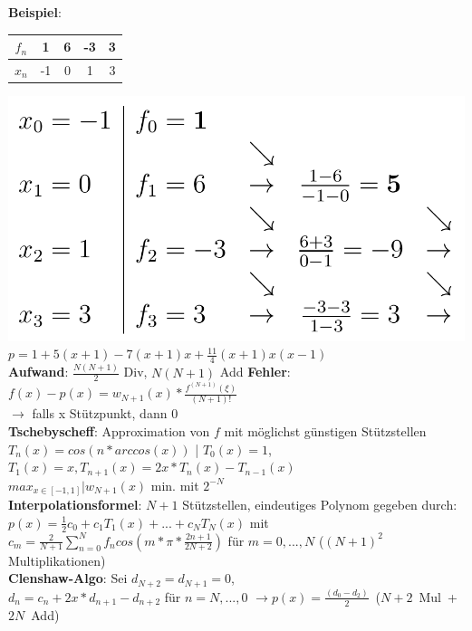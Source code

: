 \textbf{Beispiel}:
\begin{tabular}{ c|c|c|c|c } 
 $f_n$ & 1 & 6 & -3 & 3\\ 
 \hline
 $x_n$ & -1 & 0 & 1 & 3\\ 
\end{tabular}
\includegraphics[scale=0.35]{content/images/Newton_Example.pdf}\\
$p = 1 + 5(x + 1)- 7(x + 1)x + \frac{11}{4}(x+1)x(x-1)$\\
\textbf{Aufwand}: $\frac{N(N + 1)}{2}$ Div, $N(N + 1)$ Add
\textbf{Fehler}: $f(x) - p(x) = w_{N+1}(x)*\frac{f^{(N+1)}(\xi)}{(N+1)!}$\\
$\rightarrow$ falls x Stützpunkt, dann 0\\
\textbf{Tschebyscheff}: Approximation von $f$ mit möglichst günstigen Stützstellen\\
$T_n(x) = cos(n*arccos(x))$ | $T_0(x) = 1$, $T_1(x) = x, T_{n+1}(x) = 2x * T_n(x) - T_{n-1}(x)$\\
$max_{x \in [-1, 1]}|w_{N+1}(x)$ min. mit $2^{-N}$\\
\textbf{Interpolationsformel}: $N + 1$ Stützstellen, eindeutiges Polynom gegeben durch:\\
$p(x) = \frac{1}{2}c_0 + c_1T_1(x) + ... + c_NT_N(x)$ mit
$c_m = \frac{2}{N + 1}\sum_{n=0}^N f_n cos(m * \pi * \frac{2n + 1}{2N + 2})$ für $m = 0,...,N$ ($(N + 1)^2$ Multiplikationen)\\
\textbf{Clenshaw-Algo}: Sei $d_{N+2} = d_{N+1} = 0$,\\
$d_n = c_n + 2x * d_{n+1} - d_{n+2}$ für $n = N, ...,0$
\mbox{$\rightarrow p(x) = \frac{(d_0 - d_2)}{2}$ ($N + 2$ Mul + $2N$ Add)}
